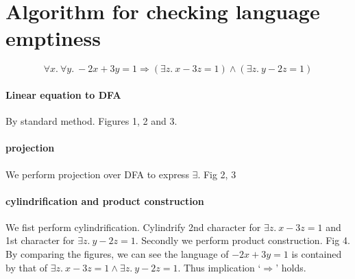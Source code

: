\section{Algorithm for checking language emptiness}

\begin{example}
  \[ \forall x.\ \forall y.\ -2 x + 3y = 1 \Rightarrow (\exists z.\ x -3z = 1) \wedge (\exists z.\ y -2z = 1) \]

  \paragraph{Linear equation to DFA} By standard method. Figures 1, 2 and 3.
  \paragraph{projection} We perform projection over DFA to express \( \exists \). Fig 2, 3
  \paragraph{cylindrification and product construction}
  We fist perform cylindrification. Cylindrify 2nd character for \( \exists z.\ x -3z = 1
  \) and 1st character for \( \exists z.\ y -2z = 1 \). Secondly we perform
  product construction. Fig 4. By comparing the figures, we can see the language of \(
  -2 x + 3y = 1 \) is contained by that of \( \exists z.\ x -3z = 1 \wedge
  \exists z.\ y -2z = 1 \). Thus implication `\( \Rightarrow \)' holds.


\end{example}
